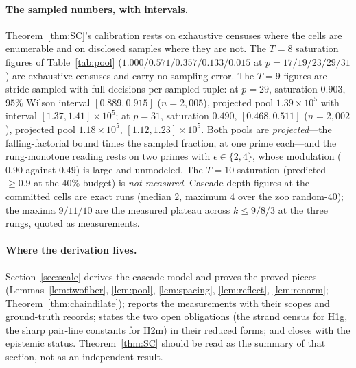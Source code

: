 \paragraph{The sampled numbers, with intervals.}
Theorem~\ref{thm:SC}'s calibration rests on exhaustive censuses where
the cells are enumerable and on disclosed samples where they are not.
The $T=8$ saturation figures of Table~\ref{tab:pool}
($1.000/0.571/0.357/0.133/0.015$ at $p=17/19/23/29/31$) are exhaustive
censuses and carry no sampling error. The $T=9$ figures are
stride-sampled with full decisions per sampled tuple: at $p=29$,
saturation $0.903$, $95\%$ Wilson interval $[0.889,0.915]$
($n=2{,}005$), projected pool $1.39\times10^5$ with interval
$[1.37,1.41]\times10^5$; at $p=31$, saturation $0.490$,
$[0.468,0.511]$ ($n=2{,}002$), projected pool $1.18\times10^5$,
$[1.12,1.23]\times10^5$. Both pools are \emph{projected}---the
falling-factorial bound times the sampled fraction, at one prime
each---and the rung-monotone reading rests on two primes with
$\epsilon\in\{2,4\}$, whose modulation ($0.90$ against $0.49$) is large
and unmodeled. The $T=10$ saturation (predicted $\ge 0.9$ at the
$40\%$ budget) is \emph{not measured}. Cascade-depth figures at the
committed cells are exact runs (median $2$, maximum $4$ over the zoo
random-$40$); the maxima $9/11/10$ are the measured plateau across
$k\le 9/8/3$ at the three rungs, quoted as measurements.

\paragraph{Where the derivation lives.}
Section~\ref{sec:scale} derives the cascade model and proves the proved
pieces (Lemmas~\ref{lem:twofiber}, \ref{lem:pool}, \ref{lem:spacing},
\ref{lem:reflect}, \ref{lem:renorm}; Theorem~\ref{thm:chaindilate});
reports the measurements with their scopes and ground-truth records;
states the two open obligations (the strand census for H1g, the sharp
pair-line constants for H2m) in their reduced forms; and closes with
the epistemic status. Theorem~\ref{thm:SC} should be read as the
summary of that section, not as an independent result.
